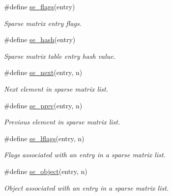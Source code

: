 \begin{CompactItemize}
\#define \hyperlink{group__dbprim__smat_a42}{se\_\-flags}(entry)
\begin{CompactList}\small\item\em Sparse matrix entry flags.\item\end{CompactList}\item 
\#define \hyperlink{group__dbprim__smat_a43}{se\_\-hash}(entry)
\begin{CompactList}\small\item\em Sparse matrix table entry hash value.\item\end{CompactList}\item 
\#define \hyperlink{group__dbprim__smat_a44}{se\_\-next}(entry, n)
\begin{CompactList}\small\item\em Next element in sparse matrix list.\item\end{CompactList}\item 
\#define \hyperlink{group__dbprim__smat_a45}{se\_\-prev}(entry, n)
\begin{CompactList}\small\item\em Previous element in sparse matrix list.\item\end{CompactList}\item 
\#define \hyperlink{group__dbprim__smat_a46}{se\_\-lflags}(entry, n)
\begin{CompactList}\small\item\em Flags associated with an entry in a sparse matrix list.\item\end{CompactList}\item 
\#define \hyperlink{group__dbprim__smat_a47}{se\_\-object}(entry, n)
\begin{CompactList}\small\item\em Object associated with an entry in a sparse matrix list.\item\end{CompactList}\end{CompactItemize}
